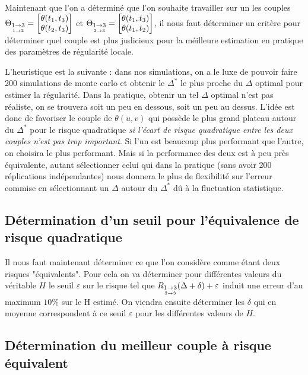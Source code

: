 
Maintenant que l'on a déterminé que l'on souhaite travailler sur un les couples $\Theta_{\underset{1 \rightarrow 2}{1 \rightarrow 3}} = \begin{bmatrix} \theta(t_1, t_3) \\ \theta(t_2, t_3) \end{bmatrix}$ et $\Theta_{\underset{2 \rightarrow 3}{1 \rightarrow 3}} = \begin{bmatrix} \theta(t_1, t_3) \\ \theta(t_1, t_2) \end{bmatrix}$, il nous faut déterminer un critère pour déterminer quel couple est plus judicieux pour la méilleure estimation en pratique des paramètres de régularité locale.

L'heuristique est la suivante : dans nos simulations, on a le luxe de pouvoir faire 200 simulations de monte carlo et obtenir le $\Delta^*$ le plus proche du $\Delta$ optimal pour estimer la régularité. Dans la pratique, obtenir un tel $\Delta$ optimal n'est pas réaliste, on se trouvera soit un peu en dessous, soit un peu au dessus. L'idée est donc de favoriser le couple de $\theta(u,v)$ qui possède le plus grand plateau autour du $\Delta^*$ pour le risque quadratique \emph{si l'écart de risque quadratique entre les deux couples n'est pas trop important}. Si l'un est beaucoup plus performant que l'autre, on choisira le plus performant. Mais si la performance des deux est à peu près équivalente, autant sélectionner celui qui dans la pratique (sans avoir 200 réplications indépendantes) nous donnera le plus de flexibilité sur l'erreur commise en sélectionnant un $\Delta$ autour du $\Delta^*$ dû à la fluctuation statistique.

\subsection{Détermination d'un seuil pour l'équivalence de risque quadratique}

Il nous faut maintenant déterminer ce que l'on considère comme étant deux risques "équivalents". Pour cela on va déterminer pour différentes valeurs du véritable $H$ le seuil $\varepsilon$ sur le risque tel que $R_{\underset{2 \rightarrow 3}{1 \rightarrow 3}}(\Delta + \delta) + \varepsilon$ induit une erreur d'au maximum $10$\% sur le H estimé. On viendra ensuite déterminer les $\delta$ qui en moyenne correspondent à ce seuil $\varepsilon$ pour les différentes valeurs de $H$.

\subsection{Détermination du meilleur couple à risque \og équivalent \fg}

